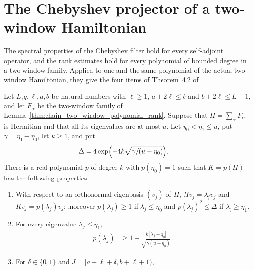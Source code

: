 \section{The Chebyshev projector of a two-window Hamiltonian}

The spectral properties of the Chebyshev filter hold for every self-adjoint
operator, and the rank estimates hold for every polynomial of bounded degree
in a two-window family. Applied to one and the same polynomial of the actual
two-window Hamiltonian, they give the four items of Theorem~4.2
of~\cite{Arad2016RigorousRG}.

\begin{lemma}
    \label{thm:alvv_two_window_chebyshev_projector}
    \leanok
    Let $L,q,\ell,a,b$ be natural numbers with $\ell\ge1$, $a+2\ell\le b$ and
    $b+2\ell\le L-1$, and let $F_\alpha$ be the two-window family of
    Lemma~\ref{thm:chain_two_window_polynomial_rank}. Suppose that
    $H=\sum_\alpha F_\alpha$ is Hermitian and that all its eigenvalues are at
    most $u$. Let $\eta_0<\eta_1\le u$, put $\gamma=\eta_1-\eta_0$, let
    $k\ge1$, and put
    \begin{align}
        \Delta & =4\exp\Bigl(-4k\sqrt{\gamma/(u-\eta_0)}\Bigr).
        \label{eq:alvv_two_window_chebyshev_delta}
    \end{align}
    There is a real polynomial $p$ of degree $k$ with $p(\eta_0)=1$ such that
    $K=p(H)$ has the following properties.
    \begin{enumerate}
        \item With respect to an orthonormal eigenbasis $(v_j)$ of $H$,
              $Hv_j=\lambda_jv_j$ and $Kv_j=p(\lambda_j)v_j$; moreover
              $p(\lambda_j)\ge1$ if $\lambda_j\le\eta_0$ and
              $p(\lambda_j)^2\le\Delta$ if $\lambda_j\ge\eta_1$.
        \item For every eigenvalue $\lambda_j\le\eta_1$,
              \begin{align}
                  p(\lambda_j) & \ge1-\frac{k\,|\lambda_j-\eta_0|}
                  {\sqrt{\gamma(u-\eta_0)}}.
                  \label{eq:alvv_two_window_chebyshev_slope}
              \end{align}
        \item For $\delta\in\{0,1\}$ and $J=[a+\ell+\delta,b+\ell+1)$,
              \begin{align}

\end{align}
\end{enumerate}
\end{lemma}
